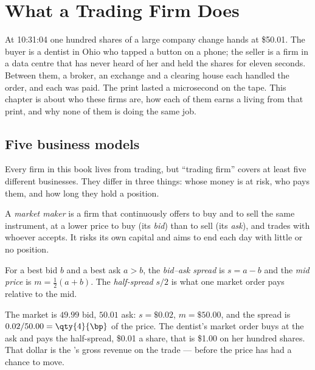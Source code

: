 \chapter{What a Trading Firm Does}\label{ch:m1:what-a-trading-firm-does}

At 10:31:04 one hundred shares of a large company change hands at \$50.01.
The buyer is a dentist in Ohio who tapped a button on a phone; the seller is
a firm in a data centre that has never heard of her and held the shares for
eleven seconds. Between them, a broker, an exchange and a clearing house each
handled the order, and each was paid. The print lasted a microsecond on the
tape. This chapter is about who these firms are, how each of them earns a
living from that print, and why none of them is doing the same job.

\section{Five business models}

Every firm in this book lives from trading, but ``trading firm'' covers at
least five different businesses. They differ in three things: whose money is
at risk, who pays them, and how long they hold a position.

\begin{definition}\label{def:m1:what-a-trading-firm-does:market-maker}
A \emph{market maker} is a firm that continuously offers
to buy and to sell the same instrument, at a lower price to buy (its
\emph{bid}) than to sell (its \emph{ask}), and trades with whoever accepts.
It risks its own capital and aims to end each day with little or no
position.
\end{definition}

\begin{definition}\label{def:m1:what-a-trading-firm-does:spread}
For a best bid $b$ and a best ask $a > b$, the
\emph{bid--ask spread} is $s = a - b$ and the
\emph{mid price} is $m = \tfrac12(a+b)$. The
\emph{half-spread} $s/2$ is what one market order pays relative to the mid.
\end{definition}

\begin{example}\label{ex:m1:what-a-trading-firm-does:dentist}
The market is $49.99$ bid, $50.01$ ask: $s = \$0.02$, $m = \$50.00$, and the
spread is $0.02/50.00 = \qty{4}{\bp}$ of the price. The dentist's market
order buys at the ask and pays the half-spread, \$0.01 a share, that is
\$1.00 on her hundred shares. That dollar is the 's gross revenue
on the trade --- before the price has had a chance to move.
\end{example}

